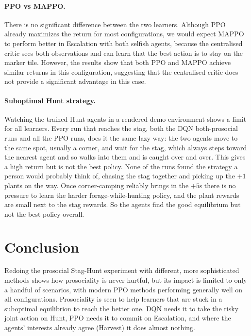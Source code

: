 \documentclass{article}
\begin{document}
\paragraph{PPO vs MAPPO.} There is no significant difference between the two learners.
Although PPO already maximizes the return for most configurations, we would expect MAPPO to perform better
in Escalation with both selfish agents, because the centralised critic sees both observations and can learn that the
  best action is to stay on the marker tile. However, the results show that both PPO and MAPPO achieve similar returns in this configuration, suggesting that the centralised critic does not provide a significant advantage in this case.

\paragraph{Suboptimal Hunt strategy.} Watching the trained Hunt agents in a rendered 
demo environment shows a limit for all learners. Every run that reaches the stag, both the DQN
both-prosocial runs and all the PPO runs, does it the same lazy way: the two agents move to the
same spot, usually a corner, and wait for the stag, which always steps toward the nearest agent
and so walks into them and is caught over and over. This gives a high return but is not the best
policy. None of the runs found the strategy a person would probably think of, chasing the stag together and
picking up the $+1$ plants on the way. Once corner-camping reliably brings in the $+5$s there is
no pressure to learn the harder forage-while-hunting policy, and the plant rewards are small next
to the stag rewards. So the agents find the good equilibrium but not the best policy overall.

\newpage 
\section{Conclusion}

Redoing the prosocial Stag-Hunt experiment with different, more sophisticated methods shows how
prosociality is never hurtful, but its impact is limited to only a handful of scenarios, with modern PPO 
methods performing generally well on all configurations. Prosociality is seen to help learners that are stuck
in a suboptimal equilibrion to reach the better one. DQN needs it to take the risky joint action on Hunt, 
PPO needs it
to commit on Escalation, and where the agents' interests already agree (Harvest) it does almost
nothing.  
\end{document}

